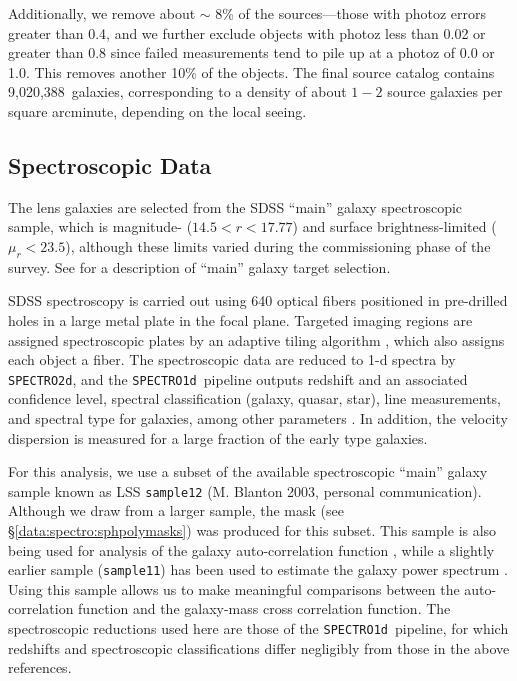 \documentclass{emulateapj}
\newcommand{\rmag}{$r$}
\newcommand{\spectroone}{\texttt{SPECTRO1d}}
\newcommand{\spectrotwo}{\texttt{SPECTRO2d}}
\newcommand{\numsource}{9,020,388}
\begin{document}
Additionally, we remove about $\sim$ 8\% of the sources---those 
with photoz errors greater than
0.4, and we further exclude objects with photoz less than 0.02 or greater than 0.8
since failed measurements tend to pile up at a photoz of 0.0 or 1.0.  This
removes another 10\% of the objects. 
The final source catalog contains \numsource\ galaxies, 
corresponding to a density of about $1-2$ source galaxies per square arcminute,
depending on the local seeing.

\subsection{Spectroscopic Data} \label{data:spectro}

The lens galaxies are selected from the SDSS 
``main'' galaxy spectroscopic sample, which is 
magnitude- ($14.5 <$\rmag$< 17.77$) and
surface brightness-limited ($\mu_r < 23.5$), although these limits
varied during the commissioning phase of the survey. 
See \citet{Strauss02} for a description of ``main'' galaxy target selection.

SDSS spectroscopy is carried out using 640 optical fibers positioned in 
pre-drilled holes in a large metal plate in the focal plane. 
Targeted imaging regions are assigned spectroscopic plates by an adaptive 
tiling algorithm \citep{Blanton03}, which also assigns each object a fiber. 
The spectroscopic data  are reduced to 1-d spectra by
\spectrotwo, and the \spectroone\ pipeline outputs redshift and an 
associated confidence level, spectral 
classification (galaxy, quasar, star), line measurements, and spectral 
type for galaxies, among other parameters 
\citep{Stough02}.  In addition, the velocity dispersion is  
measured for a large fraction of the early type galaxies.

For this analysis, 
we use a subset of the available spectroscopic ``main'' galaxy sample known as LSS 
\texttt{sample12} (M. Blanton 2003, personal communication). Although we draw
from a larger sample, the mask (see \S \ref{data:spectro:sphpolymasks}) was 
produced for this subset.  This sample is also
being used for analysis of the galaxy auto-correlation function 
\citep{Zehavi04}, while a slightly earlier 
sample (\texttt{sample11}) has been used to estimate the galaxy power spectrum
\citep{Tegmark04}.  Using this sample allows us to make meaningful comparisons
between the auto-correlation function and the galaxy-mass cross correlation
function.  The spectroscopic 
reductions used here are those of the 
\spectroone\ pipeline, for which redshifts and spectroscopic classifications
differ negligibly from those in the above references.
\end{document}
